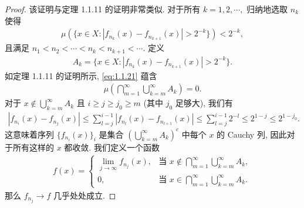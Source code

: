\documentclass[../../main.tex]{subfiles}%
\begin{document}
\begin{proof}
该证明与定理 1.1.11 的证明非常类似. 对于所有 \(k = 1, 2, \cdots,\) 归纳地选取 \(n_k\) 使得
\begin{align}
\mu(\{x \in X : |f_{n_k}(x) - f_{n_{k+1}}(x)| > 2^{-k}\}) < 2^{-k}, \label{eq:1.1.21}
\end{align}
且满足 \(n_1 < n_2 < \cdots < n_k < n_{k+1} < \cdots.\) 定义
\begin{align*}
A_k = \{x \in X : |f_{n_k}(x) - f_{n_{k+1}}(x)| > 2^{-k}\}.
\end{align*}
如定理 1.1.11 的证明所示, \eqref{eq:1.1.21} 蕴含
\begin{align}
\mu\left( \bigcap\limits_{m=1}^{\infty} \bigcup\limits_{k=m}^{\infty} A_k \right) = 0. \label{eq:1.1.22}
\end{align}
对于 \(x \notin \bigcup\limits_{k=m}^{\infty} A_k\) 且 \(i \geqslant j \geqslant j_0 \geqslant m\) (其中 \(j_0\) 足够大), 我们有
\begin{align*}
|f_{n_i}(x) - f_{n_j}(x)| \leqslant \sum\limits_{l=j}^{i-1} |f_{n_l}(x) - f_{n_{l+1}}(x)| \leqslant \sum\limits_{l=j}^{i-1} 2^{-l} \leqslant 2^{1-j} \leqslant 2^{1-j_0}.
\end{align*}
这意味着序列 \(\{f_{n_i}(x)\}_i\) 是集合 \((\bigcup\limits_{k=m}^{\infty} A_k)^c\) 中每个 \(x\) 的 Cauchy 列, 因此对于所有这样的 \(x\) 都收敛. 我们定义一个函数
\begin{align*}
f(x) = 
\begin{cases} 
\lim\limits_{j \to \infty} f_{n_j}(x), & \text{当 } x \notin \bigcap\limits_{m=1}^{\infty} \bigcup\limits_{k=m}^{\infty} A_k, \\
0, & \text{当 } x \in \bigcap\limits_{m=1}^{\infty} \bigcup\limits_{k=m}^{\infty} A_k.
\end{cases}
\end{align*}
那么 \(f_{n_j} \to f\) 几乎处处成立.
\end{proof}
\end{document}
